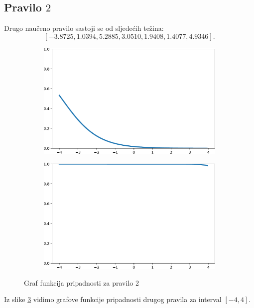 \documentclass[12pt, a4paper, numeric]{article}
\begin{document}
\subsection{Pravilo $2$}
Drugo naučeno pravilo sastoji se od sljedećih težina: 
\[[-3.8725, 1.0394, 5.2885, 3.0510, 1.9408, 1.4077, 4.9346].\]
\begin{figure}[th!]
    \centering
    \begin{subfigure}{.5\textwidth}
        \centering
        \includegraphics[width=.9\linewidth]{img/A2}
        \captionsetup{justification=centering}
        \caption{}
        \label{fig:a2}
    \end{subfigure}%
    \begin{subfigure}{.5\textwidth}
        \centering
        \includegraphics[width=.9\linewidth]{img/B2}
        \captionsetup{justification=centering}
        \caption{}
        \label{fig:b2}
    \end{subfigure}
    \caption{Graf funkcija pripadnosti za pravilo 2}
    \label{fig:pripasdnost1}
\end{figure}
Iz slike \ref{fig:pripasdnost1} vidimo grafove funkcije pripadnosti drugog pravila za interval $[-4, 4]$.
\end{document}
